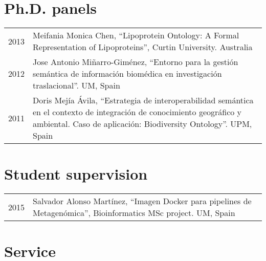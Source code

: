 \documentclass[11pt,fullpage]{article}
\begin{document}
\section*{Ph.D. panels}

\begin{longtable}{p{0.5in}|p{5.5in}}

2013 & Meifania Monica Chen, ``Lipoprotein Ontology: A Formal Representation of Lipoproteins'', Curtin University. Australia \\

2012 & Jose Antonio Mi\~narro-Gim\'enez, ``Entorno para la gesti\'on sem\'antica de informaci\'on biom\'edica en investigaci\'on traslacional''. UM, Spain \\

2011 & Doris Mej\'ia \'Avila, ``Estrategia de interoperabilidad sem\'antica en el contexto de integraci\'on de conocimiento geogr\'afico y ambiental. Caso de aplicaci\'on: Biodiversity Ontology''. UPM, Spain \\

\end{longtable}


\section*{Student supervision}

\begin{longtable}{p{0.5in}|p{5.5in}}

2015 &  Salvador Alonso Mart\'inez, ``Imagen Docker para pipelines de Metagen\'omica'', Bioinformatics MSc project. UM, Spain \\

\end{longtable}


\section*{Service}

\end{document}
